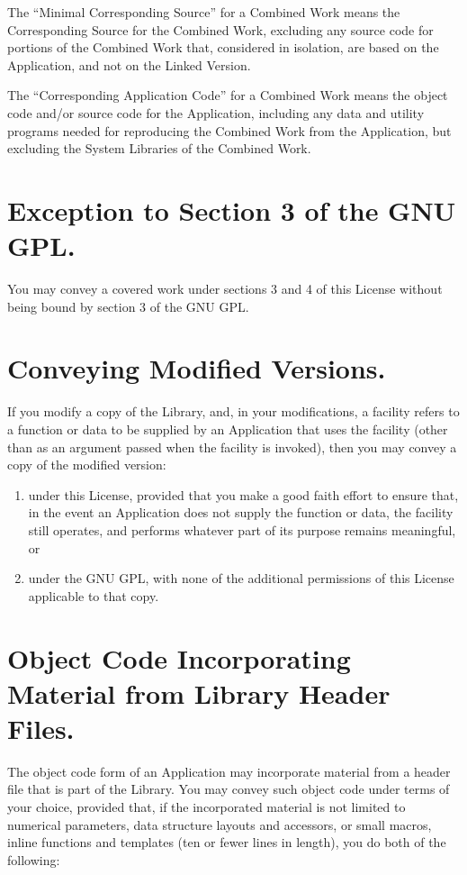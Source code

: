 \documentclass[a4paper, 12pt]{article}
\begin{document}
The ``Minimal Corresponding Source'' for a Combined Work means the Corresponding Source for the Combined Work, excluding any source code for portions of the Combined Work that, considered in isolation, are based on the Application, and not on the Linked Version.

\vspace{0.3cm}

The ``Corresponding Application Code'' for a Combined Work means the object code and/or source code for the Application, including any data and utility programs needed for reproducing the Combined Work from the Application, but excluding the System Libraries of the Combined Work.

\section{Exception to Section 3 of the GNU GPL.}

You may convey a covered work under sections 3 and 4 of this License without being bound by section 3 of the GNU GPL.

\section{Conveying Modified Versions.}

If you modify a copy of the Library, and, in your modifications, a facility refers to a function or data to be supplied by an Application that uses the facility (other than as an argument passed when the facility is invoked), then you may convey a copy of the modified version:

\begin{enumerate}[label=\alph*)]
\item under this License, provided that you make a good faith effort to ensure that, in the event an Application does not supply the function or data, the facility still operates, and performs whatever part of its purpose remains meaningful, or
\item  under the GNU GPL, with none of the additional permissions of this License applicable to that copy.
\end{enumerate}

\section{Object Code Incorporating Material from Library Header Files.}

The object code form of an Application may incorporate material from a header file that is part of the Library. You may convey such object code under terms of your choice, provided that, if the incorporated material is not limited to numerical parameters, data structure layouts and accessors, or small macros, inline functions and templates (ten or fewer lines in length), you do both of the following:
\end{document}
